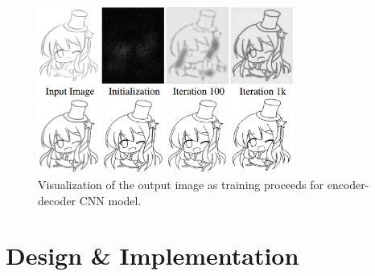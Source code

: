 \begin{figure}
    \centering
    \includegraphics[width=0.75\textwidth]{images/sketch/learning2simp.png}
    \caption{Visualization of the output image as training proceeds for encoder-decoder CNN model.} 
    \label{fig:learning2simp}
\end{figure}


\section{Design \& Implementation}
